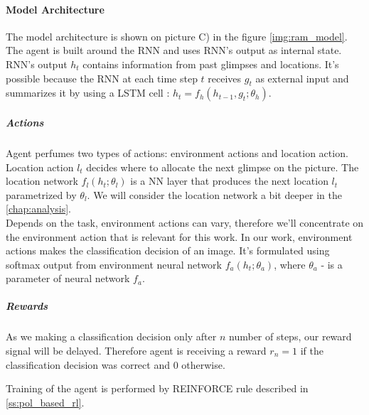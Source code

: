 \paragraph{Model Architecture} The model architecture is shown
on picture C) in the figure \ref{img:ram_model}. The agent is built around
the RNN and uses RNN's output as internal state. RNN's output $h_t$ contains
information from past glimpses and locations. It's possible
because the RNN at each time step $t$ receives $g_t$ as external input and
summarizes it by using a LSTM cell : $h_t = f_h(h_{t-1}, g_t; \theta_h)$.

\subparagraph{Actions} Agent perfumes two types of actions: environment actions
and location action. Location action $l_t$ decides where to allocate the next glimpse
on the picture. The location network $f_l(h_t; \theta_l)$ is a NN layer
that produces the next location $l_t$ parametrized by $\theta_l$. We will consider the
location network a bit deeper in the \autoref{chap:analysis}. \\
Depends on the task, environment actions can vary, therefore
we'll concentrate on the environment action that is relevant for this work.
In our work, environment actions makes the classification decision of an image.
It's formulated using softmax output from environment neural network
 $f_a(h_t; \theta_a)$, where $\theta_a$ - is a parameter of neural network $f_a$.

\subparagraph{Rewards} As we making a classification decision only after $n$
number of steps, our reward signal will be delayed. Therefore agent is receiving
a reward $r_n = 1$ if the classification decision was correct and $0$ otherwise.


Training of the agent is performed by REINFORCE rule described in \autoref{ss:pol_based_rl}.










